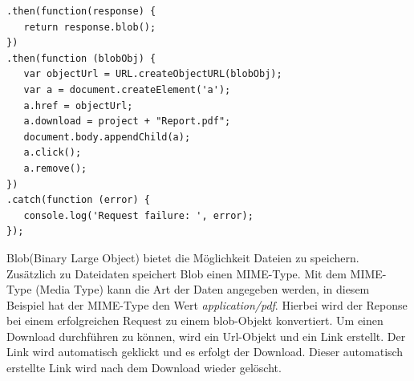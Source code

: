 \begin{samepage}%
	\begin{lstlisting}[float=tbhp]
.then(function(response) {
   return response.blob(); 
})
.then(function (blobObj) {
   var objectUrl = URL.createObjectURL(blobObj);
   var a = document.createElement('a');
   a.href = objectUrl;
   a.download = project + "Report.pdf";
   document.body.appendChild(a);
   a.click();
   a.remove(); 
})
.catch(function (error) {
   console.log('Request failure: ', error);
});
	\end{lstlisting}
\end{samepage}

Blob(Binary Large Object) bietet die Möglichkeit Dateien zu speichern. Zusätzlich zu Dateidaten speichert Blob einen MIME-Type. Mit dem MIME-Type (Media Type) kann die Art der Daten angegeben werden, in diesem Beispiel hat der MIME-Type den Wert \textit{application/pdf}. Hierbei wird der Reponse bei einem erfolgreichen Request zu einem blob-Objekt konvertiert. Um einen Download durchführen zu können, wird ein Url-Objekt und ein Link erstellt. Der Link wird automatisch geklickt und es erfolgt der Download. Dieser automatisch erstellte Link wird nach dem Download wieder gelöscht.

